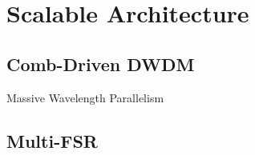 
\section{Scalable Architecture}

\subsection{Comb-Driven DWDM}

\begin{frame}{Massive Wavelength Parallelism}

\end{frame}

\subsection{Multi-FSR}
